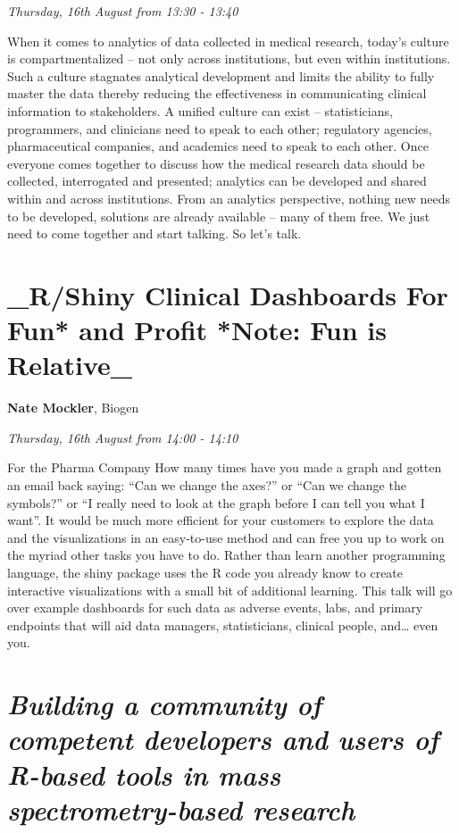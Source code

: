 \documentclass[]{book}
\theoremstyle{definition}
\theoremstyle{definition}
\theoremstyle{definition}
\theoremstyle{remark}
\begin{document}
\emph{Thursday, 16th August from 13:30 - 13:40}

When it comes to analytics of data collected in medical research,
today's culture is compartmentalized -- not only across institutions,
but even within institutions. Such a culture stagnates analytical
development and limits the ability to fully master the data thereby
reducing the effectiveness in communicating clinical information to
stakeholders. A unified culture can exist -- statisticians, programmers,
and clinicians need to speak to each other; regulatory agencies,
pharmaceutical companies, and academics need to speak to each other.
Once everyone comes together to discuss how the medical research data
should be collected, interrogated and presented; analytics can be
developed and shared within and across institutions. From an analytics
perspective, nothing new needs to be developed, solutions are already
available -- many of them free. We just need to come together and start
talking. So let's talk.

\hypertarget{rshiny-clinical-dashboards-for-fun-and-profit-note-fun-is-relative_}{%
\section{\_R/Shiny Clinical Dashboards For Fun* and Profit *Note: Fun is
Relative\_}\label{rshiny-clinical-dashboards-for-fun-and-profit-note-fun-is-relative_}}

\textbf{Nate Mockler}, Biogen

\emph{Thursday, 16th August from 14:00 - 14:10}

For the Pharma Company How many times have you made a graph and gotten
an email back saying: ``Can we change the axes?'' or ``Can we change the
symbols?'' or ``I really need to look at the graph before I can tell you
what I want''. It would be much more efficient for your customers to
explore the data and the visualizations in an easy-to-use method and can
free you up to work on the myriad other tasks you have to do. Rather
than learn another programming language, the shiny package uses the R
code you already know to create interactive visualizations with a small
bit of additional learning. This talk will go over example dashboards
for such data as adverse events, labs, and primary endpoints that will
aid data managers, statisticians, clinical people, and\ldots{} even you.

\hypertarget{building-a-community-of-competent-developers-and-users-of-r-based-tools-in-mass-spectrometry-based-research}{%
\section{\texorpdfstring{\emph{Building a community of competent
developers and users of R-based tools in mass spectrometry-based
research}}{Building a community of competent developers and users of R-based tools in mass spectrometry-based research}}\label{building-a-community-of-competent-developers-and-users-of-r-based-tools-in-mass-spectrometry-based-research}}
\end{document}
